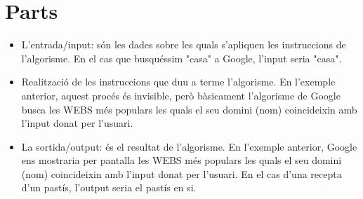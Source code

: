 \section{Parts}

\begin{itemize}
\item L'entrada/input: són les dades sobre les quals s'apliquen les instruccions de l'algorisme. En el cas que busquéssim "casa" a Google, l'input seria "casa".
\item Realització de les instruccions que duu a terme l'algorisme. En l'exemple anterior, aquest procés és invisible, però bàsicament l'algorisme de Google busca les WEBS més populars les quals el seu domini (nom) coincideixin amb l'input donat per l'usuari.
\item La sortida/output: és el resultat de l'algorisme. En l'exemple anterior, Google ens mostraria per pantalla les WEBS més populars les quals el seu domini (nom) coincideixin amb l'input donat per l'usuari. En el cas d'una recepta d'un pastís, l'output seria el pastís en si.
\end{itemize}
